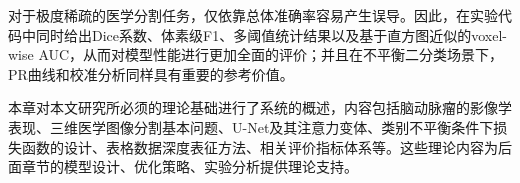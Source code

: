 对于极度稀疏的医学分割任务，仅依靠总体准确率容易产生误导。因此，在实验代码中同时给出Dice系数、体素级F1、多阈值统计结果以及基于直方图近似的voxel-wise AUC，从而对模型性能进行更加全面的评价；并且在不平衡二分类场景下，PR曲线和校准分析同样具有重要的参考价值\cite{saito2015pr,guo2017calibration,niculescumizil2005calibration,chicco2020f1}。

本章对本文研究所必须的理论基础进行了系统的概述，内容包括脑动脉瘤的影像学表现、三维医学图像分割基本问题、U-Net及其注意力变体、类别不平衡条件下损失函数的设计、表格数据深度表征方法、相关评价指标体系等。这些理论内容为后面章节的模型设计、优化策略、实验分析提供理论支持。
